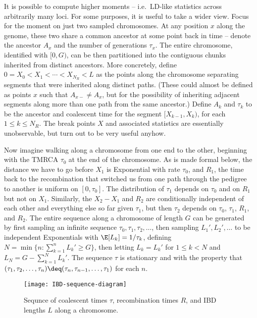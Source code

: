 It is possible to compute higher moments -- i.e.\ LD-like statistics across arbitrarily many loci.
For some purposes, it is useful to take a wider view.
Focus for the moment on just two sampled chromosomes.
At any position $x$ along the genome, these two share a common ancestor at some point back in time --
denote the ancestor $A_x$ and the number of generations $\tau_x$.
The entire chromosome, identified with $[0,G)$,
can be then partitioned into the contiguous chunks inherited from distinct ancestors.
More concretely, define $0 = X_0 < X_1 < \cdots < X_{N_R} < L$ as the points along the chromosome 
separating segments that were inherited along distinct paths.
(These could almost be defined as points $x$ such that $A_{x-} \neq A_x$,
but for the possibility of inheriting adjacent segments along more than one path from the same ancestor.)
Define $A_k$ and $\tau_k$ to be the ancestor and coalescent time for the segment $[X_{k-1},X_k)$, for each $1 \le k \le N_R$.
The break points $X$ and associated statistics are essentially unobservable,
but turn out to be very useful anyhow.

Now imagine walking along a chromosome from one end to the other, beginning with the TMRCA $\tau_0$ at the end of the chromosome.
As is made formal below,
the distance we have to go before $X_1$ is Exponential with rate $\tau_0$,
and $R_1$, the time back to the recombination that switched us from one path through the pedigree to another is uniform on $[0,\tau_0]$.
The distribution of $\tau_1$ depends on $\tau_0$ and on $R_1$ but not on $X_1$.
Similarly, the $X_2-X_1$ and $R_2$ are conditionally independent of each other and everything else so far given $\tau_1$,
but then $\tau_2$ depends on $\tau_0$, $\tau_1$, $R_1$, and $R_2$.
The entire sequence along a chromosome of length $G$ can be generated
by first sampling an infinite sequence $\tau_0,\tau_1,\tau_2,\ldots$,
then sampling $L_1', L_2', \ldots$ to be independent Exponentials with $\E[L_k] = 1/\tau_k$,
defining $N = \min \{n : \sum_{k =1}^n L_k' \ge G \}$,
then letting $L_k = L_k'$ for $1 \le k < N$ and $L_N = G - \sum_{k =1}^N L_k'$.
The sequence $\tau$ is stationary
and with the property that $(\tau_1, \tau_2, \ldots, \tau_n) \deq  (\tau_n, \tau_{n-1}, \ldots, \tau_1)$ for each $n$.


\begin{figure}[ht!]
  \begin{center}
    \texttt{[image: IBD-sequence-diagram]}
  \end{center}
  \caption{
  Sequnce of coalescent times $\tau$, recombination times $R$, and IBD lengths $L$ along a chromosome.
  }
\end{figure}

